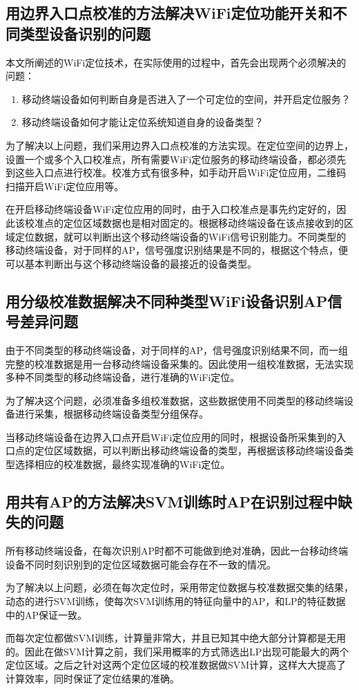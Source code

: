 \documentclass[a4paper, UTF8]{ctexart}
\begin{document}
\subsection{用边界入口点校准的方法解决WiFi定位功能开关和不同类型设备识别的问题}
本文所阐述的WiFi定位技术，在实际使用的过程中，首先会出现两个必须解决的问题：
\begin{enumerate}
\item 移动终端设备如何判断自身是否进入了一个可定位的空间，并开启定位服务？
\item 移动终端设备如何才能让定位系统知道自身的设备类型？
\end{enumerate}
\par
为了解决以上问题，我们采用边界入口点校准的方法实现。在定位空间的边界上，设置一个或多个入口校准点，所有需要WiFi定位服务的移动终端设备，都必须先到这些入口点进行校准。校准方式有很多种，如手动开启WiFi定位应用，二维码扫描开启WiFi定位应用等。
\par
在开启移动终端设备WiFi定位应用的同时，由于入口校准点是事先约定好的，因此该校准点的定位区域数据也是相对固定的。根据移动终端设备在该点接收到的区域定位数据，就可以判断出这个移动终端设备的WiFi信号识别能力。不同类型的移动终端设备，对于同样的AP，信号强度识别结果是不同的，根据这个特点，便可以基本判断出与这个移动终端设备的最接近的设备类型。

\subsection{用分级校准数据解决不同种类型WiFi设备识别AP信号差异问题}
由于不同类型的移动终端设备，对于同样的AP，信号强度识别结果不同，而一组完整的校准数据是用一台移动终端设备采集的。因此使用一组校准数据，无法实现多种不同类型的移动终端设备，进行准确的WiFi定位。
\par
为了解决这个问题，必须准备多组校准数据，这些数据使用不同类型的移动终端设备进行采集，根据移动终端设备类型分组保存。
\par
当移动终端设备在边界入口点开启WiFi定位应用的同时，根据设备所采集到的入口点的定位区域数据，可以判断出移动终端设备的类型，再根据该移动终端设备类型选择相应的校准数据，最终实现准确的WiFi定位。

\subsection{用共有AP的方法解决SVM训练时AP在识别过程中缺失的问题}
所有移动终端设备，在每次识别AP时都不可能做到绝对准确，因此一台移动终端设备不同时刻识别到的定位区域数据可能会存在不一致的情况。
\par
为了解决以上问题，必须在每次定位时，采用带定位数据与校准数据交集的结果，动态的进行SVM训练，使每次SVM训练用的特征向量中的AP，和LP的特征数据中的AP保证一致。
\par
而每次定位都做SVM训练，计算量非常大，并且已知其中绝大部分计算都是无用的。因此在做SVM计算之前，我们采用概率的方式筛选出LP出现可能最大的两个定位区域。之后之针对这两个定位区域的校准数据做SVM计算，这样大大提高了计算效率，同时保证了定位结果的准确。
\end{document}
